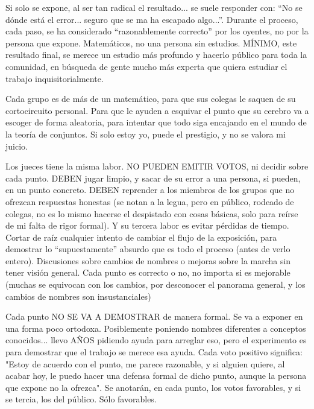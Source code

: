 \noindent
Si solo se expone, al ser tan radical el resultado... se suele responder con: ``No se dónde está el error... seguro que se ma ha escapado algo...''. Durante el proceso, cada paso, se ha considerado ``razonablemente correcto'' por los oyentes, no por la persona que expone. Matemáticos, no una persona sin estudios. MÍNIMO, este resultado final, se merece un estudio más profundo y hacerlo público para toda la comunidad, en búsqueda de gente mucho más experta que quiera estudiar el trabajo inquisitorialmente.

\noindent
Cada grupo es de más de un matemático, para que sus colegas le saquen de su cortocircuito personal. Para que le ayuden a esquivar el punto que su cerebro va a escoger de forma aleatoria, para intentar que todo siga encajando en el mundo de la teoría de conjuntos. Si solo estoy yo, puede el prestigio, y no se valora mi juicio.

\noindent
Los jueces tiene la misma labor. NO PUEDEN EMITIR VOTOS, ni decidir sobre cada punto. DEBEN jugar limpio, y sacar de su error a una persona, si pueden, en un punto concreto. DEBEN reprender a los miembros de los grupos que no ofrezcan respuestas honestas (se notan a la legua, pero en público, rodeado de colegas, no es lo mismo hacerse el despistado con cosas básicas, solo para reírse de mi falta de rigor formal). Y su tercera labor es evitar pérdidas de tiempo. Cortar de raíz cualquier intento de cambiar el flujo de la exposición, para demostrar lo ``supuestamente'' absurdo que es todo el proceso (antes de verlo entero). Discusiones sobre cambios de nombres o mejoras sobre la marcha sin tener visión general. Cada punto es correcto o no, no importa si es mejorable (muchas se equivocan con los cambios, por desconocer el panorama general, y los cambios de nombres son insustanciales)

\noindent
Cada punto NO SE VA A DEMOSTRAR de manera formal. Se va a exponer en una forma poco ortodoxa. Posiblemente poniendo nombres diferentes a conceptos conocidos... llevo AÑOS pidiendo ayuda para arreglar eso, pero el experimento es para demostrar que el trabajo se merece esa ayuda. Cada voto positivo significa: "Estoy de acuerdo con el punto, me parece razonable, y si alguien quiere, al acabar hoy, le puedo hacer una defensa formal de dicho punto, aunque la persona que expone no la ofrezca". Se anotarán, en cada punto, los votos favorables, y si se tercia, los del público. Sólo favorables.

